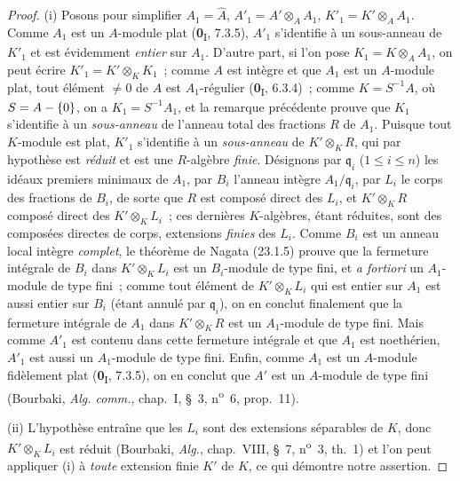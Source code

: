 \begin{proof}
(i) Posons pour simplifier $A_1=\widehat A$,
$A'_1=A'\otimes_AA_1$, $K'_1=K'\otimes_AA_1$. Comme $A_1$ est un
$A$-module plat (\textbf{0}\textsubscript{I}, 7.3.5), $A'_1$ s'identifie à un
sous-anneau de $K'_1$ et est évidemment \emph{entier} sur $A_1$. D'autre part, si
l'on pose $K_1=K\otimes_AA_1$, on peut écrire
$K'_1=K'\otimes_KK_1$~; comme $A$ est intègre et que $A_1$ est un $A$-module
plat, tout élément $\neq0$ de $A$ est $A_1$-régulier
(\textbf{0}\textsubscript{I}, 6.3.4)~; comme $K=S^{-1}A$, où $S=A-\{0\}$, on a
$K_1=S^{-1}A_1$, et la remarque précédente prouve que $K_1$ s'identifie à un
\emph{sous-anneau} de l'anneau total des fractions $R$ de $A_1$. Puisque tout
$K$-module est plat, $K'_1$ s'identifie à un \emph{sous-anneau} de $K'\otimes_KR$,
qui par hypothèse est \emph{réduit} et est une $R$-algèbre \emph{finie}. Désignons par
$\mathfrak q_i$ ($1\leqslant i\leqslant n$) les idéaux premiers minimaux de
$A_1$, par $B_i$ l'anneau intègre $A_1/\mathfrak q_i$, par $L_i$ le corps des
fractions de $B_i$, de sorte que $R$ est composé direct des $L_i$, et
$K'\otimes_KR$ composé direct des $K'\otimes_KL_i$~; ces dernières
$K$-algèbres, étant réduites, sont des composées directes de corps,
extensions \emph{finies} des $L_i$. Comme $B_i$ est un anneau local intègre
\emph{complet}, le théorème de Nagata (23.1.5) prouve que la fermeture
intégrale de $B_i$ dans $K'\otimes_KL_i$ est un $B_i$-module de type fini, et
\emph{a fortiori} un $A_1$-module de type fini~; comme tout élément de
$K'\otimes_KL_i$ qui est entier sur $A_1$ est aussi entier sur $B_i$ (étant
annulé par $\mathfrak q_i$), on en conclut finalement que la fermeture
intégrale de $A_1$ dans $K'\otimes_KR$ est un $A_1$-module de type fini. Mais
comme $A'_1$ est contenu dans cette fermeture intégrale et que $A_1$ est
noethérien, $A'_1$ est aussi un $A_1$-module de type fini. Enfin, comme $A_1$
est un $A$-module fidèlement plat (\textbf{0}\textsubscript{I}, 7.3.5), on en conclut
que $A'$ est un $A$-module de type fini (Bourbaki, \emph{Alg. comm.},
chap.~I, §~3, n\textsuperscript{o}~6, prop.~11).


(ii) L'hypothèse entraîne que les $L_i$ sont des extensions séparables
de $K$, donc $K'\otimes_KL_i$ est réduit (Bourbaki, \emph{Alg.}, chap.~VIII,
§~7, n\textsuperscript{o}~3, th.~1) et l'on peut appliquer (i) à \emph{toute}
extension finie $K'$ de $K$, ce qui démontre notre assertion.
\end{proof}

